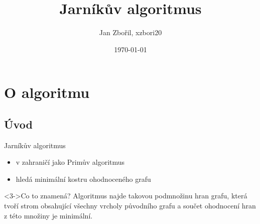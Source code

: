 \documentclass[pdf]{beamer}
\title[ITY - 5. projekt]{Jarníkův algoritmus}
\author{Jan Zbořil, xzbori20}
\institute{FIT VUT Brno}
\date{\today}
\begin{document}
\begin{frame}
  \titlepage
\end{frame}


\section{O algoritmu}
\subsection{Úvod}

\begin{frame}{Jarníkův algoritmus}

\begin{itemize}
  \item<1-> v zahraničí jako Primův algoritmus
  \item<2-> hledá minimální kostru ohodnoceného grafu
\end{itemize}

\vskip 0.5cm

\begin{block}<3->{Co to znamená?}
Algoritmus najde takovou podmnožinu hran grafu, která tvoří strom obsahující všechny vrcholy původního grafu a součet ohodnocení hran z této množiny je minimální.
\end{block}

\end{frame}
\end{document}
